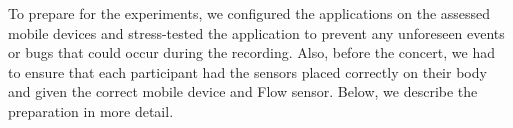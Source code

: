 \begin{table}
\begin{center}
\caption{Device models used during the concert}
\end{center}
\end{table}

To prepare for the experiments, we configured the applications on the assessed mobile devices and stress-tested the application to prevent any unforeseen events or bugs that could occur during the recording. Also, before the concert, we had to ensure that each participant had the sensors placed correctly on their body and given the correct mobile device and Flow sensor. Below, we describe the preparation in more detail.

